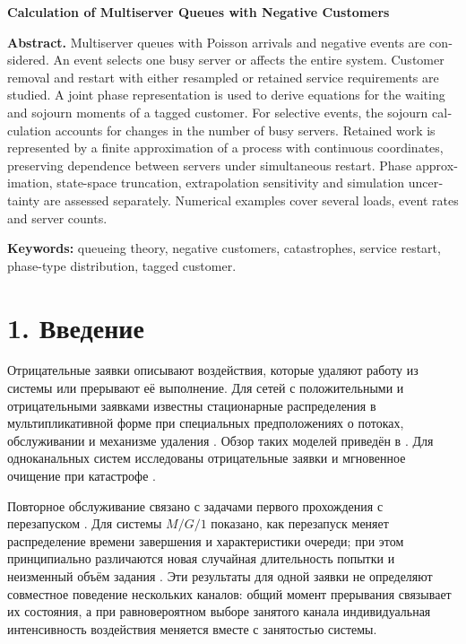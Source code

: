 \begin{otherlanguage}{english}
\bigskip
\begin{center}\textbf{Calculation of Multiserver Queues with Negative Customers}\end{center}
\textbf{Abstract.} Multiserver queues with Poisson arrivals and negative events are considered. An event selects one busy server or affects the entire system. Customer removal and restart with either resampled or retained service requirements are studied. A joint phase representation is used to derive equations for the waiting and sojourn moments of a tagged customer. For selective events, the sojourn calculation accounts for changes in the number of busy servers. Retained work is represented by a finite approximation of a process with continuous coordinates, preserving dependence between servers under simultaneous restart. Phase approximation, state-space truncation, extrapolation sensitivity and simulation uncertainty are assessed separately. Numerical examples cover several loads, event rates and server counts.

\textbf{Keywords:} queueing theory, negative customers, catastrophes, service restart, phase-type distribution, tagged customer.
\end{otherlanguage}

\section*{1. Введение}
Отрицательные заявки описывают воздействия, которые удаляют работу из системы или прерывают её выполнение. Для сетей с положительными и отрицательными заявками известны стационарные распределения в мультипликативной форме при специальных предположениях о потоках, обслуживании и механизме удаления \cite{gelenbe1991,gelenbe1992}. Обзор таких моделей приведён в \cite{artalejo2000}. Для одноканальных систем исследованы отрицательные заявки \cite{harrison1996} и мгновенное очищение при катастрофе \cite{jain1996}.

Повторное обслуживание связано с задачами первого прохождения с перезапуском \cite{pal2017}. Для системы \(M/G/1\) показано, как перезапуск меняет распределение времени завершения и характеристики очереди; при этом принципиально различаются новая случайная длительность попытки и неизменный объём задания \cite{bonomo2022}. Эти результаты для одной заявки не определяют совместное поведение нескольких каналов: общий момент прерывания связывает их состояния, а при равновероятном выборе занятого канала индивидуальная интенсивность воздействия меняется вместе с занятостью системы.


